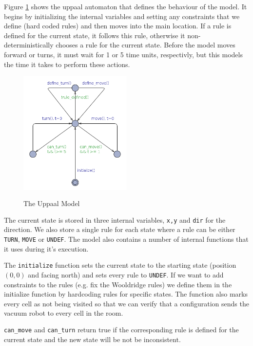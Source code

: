 \documentclass{article}
\begin{document}
    Figure \ref{fig:model} shows the uppaal automaton that defines the behaviour of the model. It begins by initializing the internal variables and setting any constraints that we define (hard coded rules) and then moves into the main location. If a rule is defined for the current state, it follows this rule, otherwise it non-deterministically chooses a rule for the current state. Before the model moves forward or turns, it must wait for 1 or 5 time units, respectivly, but this models the time it takes to perform these actions.

    \begin{figure}[h!]
        \caption{The Uppaal Model}
        \centering
        \includegraphics[width=0.5\textwidth]{model.png}
        \label{fig:model}
    \end{figure}

    The current state is stored in three internal variables, \texttt{x,y} and \texttt{dir} for the direction. We also store a single rule for each state where a rule can be either \texttt{TURN}, \texttt{MOVE} or \texttt{UNDEF}. The model also contains a number of internal functions that it uses during it's execution.
    
    The \texttt{initialize} function sets the current state to the starting state (position $(0,0)$ and facing north) and sets every rule to \texttt{UNDEF}. If we want to add constraints to the rules (e.g. fix the  Wooldridge rules) we define them in the initialize function by hardcoding rules for specific states. The function also marks every cell as not being visited so that we can verify that a configuration sends the vacuum robot to every cell in the room.

    \texttt{can\_move} and \texttt{can\_turn} return true if the corresponding rule is defined for the current state  and the new state will be not be inconsistent.
\end{document}
